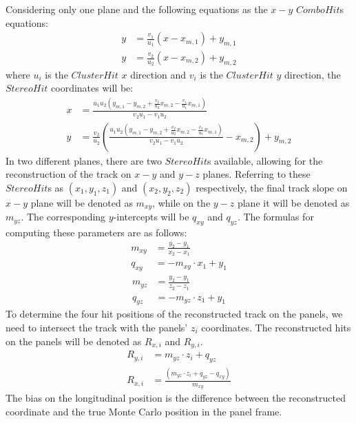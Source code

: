 Considering only one plane and the following equations as the $x-y$ $Combo Hit$s equations:
\begin{equation}
    \begin{aligned}
        y&=\frac{v_1}{u_1}(x-x_{m,1})+y_{m,1} \\
        y&=\frac{v_2}{u_2}(x-x_{m,2})+y_{m,2} 
    \end{aligned}
    \end{equation}
where $u_i$ is the $ClusterHit$ $x$ direction and $v_i$ is the $ClusterHit$ $y$ direction, the $StereoHit$ coordinates will be:
\begin{equation}\label{x}
    \begin{aligned}
x&=\frac{u_1 u_2(y_{m,1}-y_{m,2}+\frac{v_2}{u_2}x_{m,2}-\frac{v_1}{u_1}x_{m,1})}{v_2 u_1 - v_1 u_2}\\
y&=\frac{v_2}{u_2}\left(\frac{u_1 u_2(y_{m,1}-y_{m,2}+\frac{v_2}{u_2}x_{m,2}-\frac{v_1}{u_1}x_{m,1})}{v_2 u_1 - v_1 u_2}-x_{m,2}\right)+y_{m,2}
\end{aligned}
\end{equation}
In two different planes, there are two $StereoHit$s available, allowing for the reconstruction of the track on $x-y$ and $y-z$ planes. 
Referring to these $StereoHit$s as $(x_1,y_1,z_1)$ and $(x_2,y_2,z_2)$ respectively, the final track slope on $x-y$ plane will be 
denoted as $m_{xy}$, while on the $y-z$ plane it will be denoted as $m_{yz}$. The corresponding $y$-intercepts will be $q_{xy}$ and $q_{yz}$.
The formulas for computing these parameters are as follows:
\begin{equation}
    \begin{aligned}
m_{xy}&=\frac{y_2-y_1}{x_2-x_1}\\
q_{xy}&=-m_{xy} \cdot x_1+y_1
\end{aligned}
\end{equation}
\begin{equation}
    \begin{aligned}
m_{yz}&=\frac{y_2-y_1}{z_2-z_1}\\
q_{yz}&=-m_{yz} \cdot z_1+y_1
\end{aligned}
\end{equation}
To determine the four hit positions of the reconstructed track on the panels, we need to intersect the track with the panels' $z_i$ coordinates. 
The reconstructed hits on the panels will be denoted as $R_{x,i}$ and $R_{y,i}$.
\begin{equation}
    \begin{aligned}
 R_{y,i}&=m_{yz}\cdot z_i+q_{yz}\\
 R_{x,i}&=\frac{(m_{yz}\cdot z_i+q_{yz}-q_{xy})}{m_{xy}}
\end{aligned}
\end{equation}
The bias on the longitudinal position is the difference between the reconstructed coordinate and the true Monte Carlo position in the panel frame.


